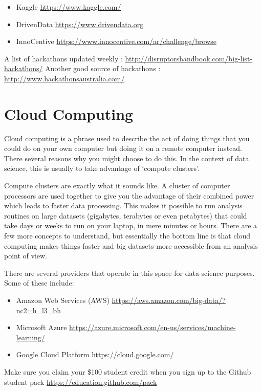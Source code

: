 \documentclass[]{book}
\providecommand{\tightlist}{%
  \setlength{\itemsep}{0pt}\setlength{\parskip}{0pt}}
\theoremstyle{definition}
\theoremstyle{definition}
\theoremstyle{remark}
\begin{document}
\begin{itemize}
\tightlist
\item
  Kaggle \url{https://www.kaggle.com/}
\item
  DrivenData \url{https://www.drivendata.org}
\item
  InnoCentive \url{https://www.innocentive.com/ar/challenge/browse}
\end{itemize}

A list of hackathons updated weekly :
\url{http://disruptorshandbook.com/big-list-hackathons/} Another good
source of hackathons : \url{http://www.hackathonsaustralia.com/}

\section{Cloud Computing}\label{cloud-computing}

Cloud computing is a phrase used to describe the act of doing things
that you could do on your own computer but doing it on a remote computer
instead. There several reasons why you might choose to do this. In the
context of data science, this is usually to take advantage of `compute
clusters'.

Compute clusters are exactly what it sounds like. A cluster of computer
processors are used together to give you the advantage of their combined
power which leads to faster data processing. This makes it possible to
run analysis routines on large datasets (gigabytes, terabytes or even
petabytes) that could take days or weeks to run on your laptop, in mere
minutes or hours. There are a few more concepts to understand, but
essentially the bottom line is that cloud computing makes things faster
and big datasets more accessible from an analysis point of view.

There are several providers that operate in this space for data science
purposes. Some of these include:

\begin{itemize}
\tightlist
\item
  Amazon Web Services (AWS)
  \url{https://aws.amazon.com/big-data/?nc2=h_l3_bh}
\item
  Microsoft Azure
  \url{https://azure.microsoft.com/en-us/services/machine-learning/}
\item
  Google Cloud Platform \url{https://cloud.google.com/}
\end{itemize}

Make sure you claim your \$100 student credit when you sign up to the
Github student pack \url{https://education.github.com/pack}
\end{document}
